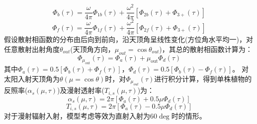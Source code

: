 \begin{equation}
\Phi_{b}(\tau)=\frac{\omega}{4 \pi} \Phi_{1 b}(\tau)+\frac{\omega^{2}}{4 \pi}\left[\Phi_{2 b}(\tau)+\Phi_{3+}(\tau)\right]
\end{equation}
\begin{equation}
\Phi_{f}(\tau)=\frac{\omega}{4 \pi} \Phi_{1 f}(\tau)+\frac{\omega^{2}}{4 \pi}\left[\Phi_{2 f}(\tau)+\Phi_{3+}(\tau)\right]
\end{equation}
假设散射相函数的分布由后向到前向，沿天顶角呈线性变化(方位角水平均一)，对任意散射出射角度$\theta_{out}$(天顶角方向，$\mu_{out}=\cos{\theta_{out}}$)，其总的散射相函数计算为：
\begin{equation}
\Phi_{\mu_{\mathrm{out}}}(\tau)=\Phi_{a}(\tau)+\mu_{\mathrm{out}} \Phi_{d}(\tau)
\end{equation}
其中$\Phi_a\left(\tau\right)=0.5\left[\Phi_b\left(\tau\right)+\Phi_f\left(\tau\right)\right]$，$\Phi_d\left(\tau\right)=0.5\left[\Phi_b\left(\tau\right)-\Phi_f\left(\tau\right)\right]$。
对太阳入射天顶角为$\theta(\mu=\cos{\theta})$时，对$\Phi_{\mu_{out}}\left(\tau\right)$进行积分计算，得到单株植物的反照率($\alpha_s\left(\mu,\tau\right)$)及漫射透射率($T_{i,s}\left(\mu,\tau\right)$)为：
\begin{equation}
\alpha_{s}(\mu, \tau)=2 \pi\left[\Phi_{a}(\tau)+0.5 \mu \Phi_{d}(\tau)\right]
\end{equation}
\begin{equation}
T_{i, s}(\mu, \tau)=2 \pi\left[\Phi_{a}(\tau)-0.5 \mu \Phi_{d}(\tau)\right]
\end{equation}
对于漫射辐射入射，模型考虑等效为直射入射为60$\deg$时的情形。
